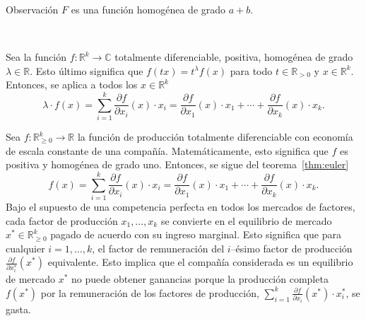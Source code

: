 \begin{frame}%
\frametitle{\secname}
\begin{alert}{Observación}
$F$ es una función homogénea de grado $a+b$.
\end{alert}

\

\begin{theorem}[Euler]\label{thm:euler}
Sea la función $f\colon\mathds{R}^{k}\rightarrow\mathds{C}$ totalmente diferenciable, positiva, homogénea de grado $\lambda\in\mathds{R}$. Esto último significa que $f\left(tx\right)=t^{\lambda}f\left(x\right)$ para todo $t\in\mathds{R}_{>0}$ y $x\in\mathds{R}^{k}$. Entonces, se aplica a todos los $x\in\mathds{R}^{k}$ \[ \lambda\cdot f\left(x\right)=\sum_{i=1}^{k}\frac{\partial f}{\partial x_{i}}\left(x\right)\cdot x_{i}=\frac{\partial f}{\partial x_{1}}\left(x\right)\cdot x_{1}+\cdots+\frac{\partial f}{\partial x_{k}}\left(x\right)\cdot x_{k}. \]
\end{theorem}
\end{frame}

\begin{frame}
\begin{corollary}
Sea $f\colon\mathds{R}^{k}_{\geq0}\rightarrow\mathds{R}$ la función de producción totalmente diferenciable con economía de escala constante de una compañía. Matemáticamente, esto significa que $f$ es positiva y homogénea de grado uno. Entonces, se sigue del teorema~\ref{thm:euler} \[ f\left(x\right)=\sum_{i=1}^{k}\frac{\partial f}{\partial x_{i}}\left(x\right)\cdot x_{i}=\frac{\partial f}{\partial x_{1}}\left(x\right)\cdot x_{1}+\cdots+\frac{\partial f}{\partial x_{k}}\left(x\right)\cdot x_{k}. \] Bajo el supuesto de una competencia perfecta en todos los mercados de factores, cada factor de producción  $x_{1},\ldots, x_{k}$ se convierte en el equilibrio de mercado $x^{\ast}\in\mathds{R}^{k}_{\geq0}$ pagado de acuerdo con su ingreso marginal. Esto significa que para cualquier $i=1,\ldots,k$, el factor de remuneración del $i$--ésimo factor de producción $\frac{\partial f}{\partial x^{\ast}_{i}}\left(x^{\ast}\right)$ equivalente. Esto implica que el compañía considerada es un equilibrio de mercado $x^{\ast}$ no puede obtener ganancias porque la producción completa $f\left(x^{\ast}\right)$ por la remuneración de los factores de producción, $\sum_{i=1}^{k}\frac{\partial f}{\partial x_{i}}\left(x^{\ast}\right)\cdot x^{\ast}_{i}$, se gasta.
\end{corollary}
\end{frame}

